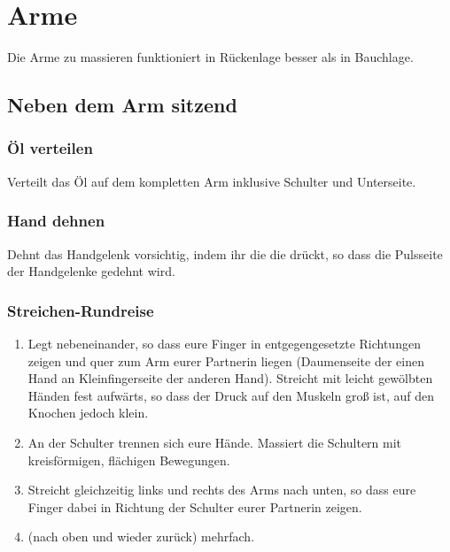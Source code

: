 \section{Arme}
Die Arme zu massieren funktioniert in Rückenlage besser als in Bauchlage.

\subsection{Neben dem Arm sitzend}

\subsubsection{Öl verteilen}
Verteilt das Öl auf dem kompletten Arm inklusive Schulter und Unterseite.

\subsubsection{Hand dehnen}
Dehnt das Handgelenk vorsichtig, indem ihr die die  drückt, so dass die Pulsseite der Handgelenke gedehnt wird.

\subsubsection{Streichen-Rundreise}
\begin{oframed}
	\begin{enumerate}
		\item {} Legt  nebeneinander, so dass eure Finger in entgegengesetzte Richtungen zeigen und quer zum Arm eurer Partnerin liegen (Daumenseite der einen Hand an Kleinfingerseite der anderen Hand). Streicht mit leicht gewölbten Händen fest aufwärts, so dass der Druck auf den Muskeln groß ist, auf den Knochen jedoch klein.
		\item {} An der Schulter trennen sich eure Hände. Massiert die Schultern mit kreisförmigen, flächigen Bewegungen.
		\item {} Streicht gleichzeitig links und rechts des Arms nach unten, so dass eure Finger dabei in Richtung der Schulter eurer Partnerin zeigen.
		\item {} (nach oben und wieder zurück) mehrfach.
	\end{enumerate}
\end{oframed}

